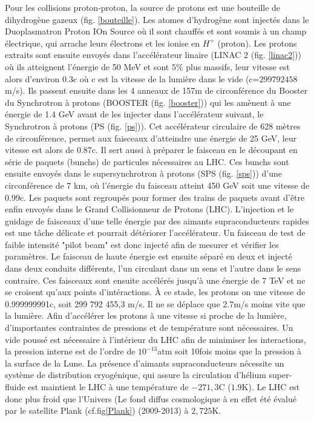 Pour les collisions proton-proton, la source de protons est une bouteille de dihydrogène gazeux (fig. \ref{bouteille}). Les atomes d’hydrogène sont injectés dans le Duoplasmatron Proton IOn Source où il sont chauffés et sont soumis à un champ électrique, qui arrache leurs électrons et les ionise en $H^{+}$ (proton). Les protons extraits sont ensuite envoyés dans l'accélérateur linaire (LINAC 2 (fig. \ref{linac2})) où ils atteignent l'énergie de 50 MeV et sont $5\%$ plus massifs, leur vitesse est alors d'environ $0.3$c où c est la vitesse de la lumière dans le vide (c=$299 792 458$ m/s). Ils passent ensuite dans les 4 anneaux de 157m de circonférence du Booster du Synchrotron à protons (BOOSTER (fig. \ref{booster})) qui les amènent à une énergie de 1.4 GeV avant de les injecter dans l'accélérateur suivant, le Synchrotron à protons (PS (fig. \ref{ps})). Cet accélérateur circulaire de 628 mètres de circonférence, permet aux faisceaux d'atteindre une énergie de 25 GeV, leur vitesse est alors de 0.87c. Il sert aussi à préparer le faisceau en le découpant en série de paquets (bunchs) de particules nécessaires au LHC. Ces bunchs sont ensuite envoyés dans le supersynchrotron à protons (SPS (fig. \ref{sps})) d'une circonférence de 7 km, où l'énergie du faisceau atteint 450 GeV soit une vitesse de 0.99c. Les paquets sont regroupés pour former des trains de paquets avant d'être enfin envoyés dans le Grand Collisionneur de Protons (LHC). L'injection et le guidage de faisceaux d'une telle énergie par des aimants supraconducteurs rapides est une tâche délicate et pourrait détériorer l'accélérateur. Un faisceau de test de faible intensité "pilot beam" est donc injecté afin de mesurer et vérifier les paramètres. Le faisceau de haute énergie est ensuite séparé en deux et injecté dans deux conduits différents, l'un circulant dans un sens et l'autre dans le sens contraire. Ces faisceaux sont ensuite accélérés jusqu'à une énergie de 7 TeV et ne se croisent qu'aux points d'intéractions. À ce stade, les protons on une vitesse de 0.999999991c, soit 299 792 455,3 m/s. Il ne se déplace que 2.7m/s moins vite que la lumière. Afin d'accélérer les protons à une vitesse si proche de la lumière, d'importantes contraintes de pressions et de température sont nécessaires. Un vide poussé est nécessaire à l'intérieur du LHC afin de minimiser les interactions, la pression interne est de l'ordre de $10^{-13}$atm soit 10fois moins que la pression à la surface de la Lune. La présence d'aimants supraconducteurs nécessite un système de distribution cryogénique, qui assure la circulation d'hélium super-fluide est maintient le LHC à une température de $-271,3$\degre C ($1.9$K). Le LHC est donc plus froid que l'Univers (Le fond diffus cosmologique à en effet été évalué par le satellite Plank (cf.fig\ref{Plank}) (2009-2013) à $2,725$K.

